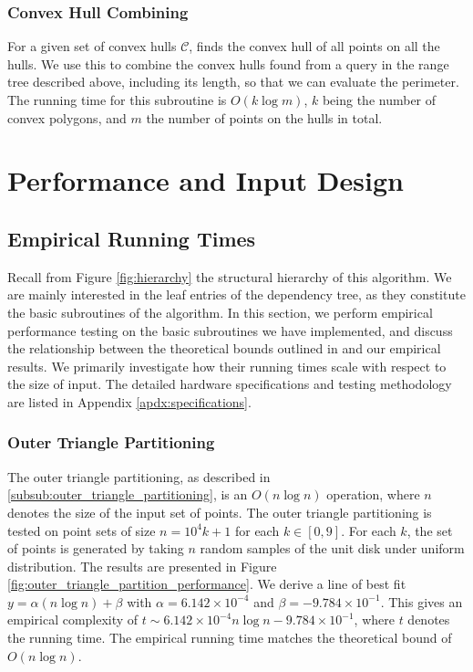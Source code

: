 \documentclass{article}
\newcommand{\figref}[1]{Figure \ref{#1}}
\newcommand{\apdxref}[1]{Appendix \ref{#1}}
\begin{document}
\subsubsection{Convex Hull Combining}
For a given set of convex hulls $\mathcal{C}$, finds the convex hull of all points on all the hulls. We use this to combine the convex hulls found from a query in the range tree described above, including its length, so that we can evaluate the perimeter. The running time for this subroutine is $O(k \log m)$, $k$ being the number of convex polygons, and $m$ the number of points on the hulls in total.

\section{Performance and Input Design}


\subsection{Empirical Running Times}

Recall from \figref{fig:hierarchy} the structural hierarchy of this algorithm. We are mainly interested in the leaf entries of the dependency tree, as they constitute the basic subroutines of the algorithm. In this section, we perform empirical performance testing on the basic subroutines we have implemented, and discuss the relationship between the theoretical bounds outlined in \cite{abb17} and our empirical results. We primarily investigate how their running times scale with respect to the size of input. The detailed hardware specifications and testing methodology are listed in \apdxref{apdx:specifications}.

\subsubsection{Outer Triangle Partitioning}

The outer triangle partitioning, as described in \ref{subsub:outer_triangle_partitioning}, is an $O(n \log n)$ operation, where $n$ denotes the size of the input set of points. The outer triangle partitioning is tested on point sets of size $n = 10^4 k + 1$ for each $k \in [0, 9]$. For each $k$, the set of points is generated by taking $n$ random samples of the unit disk under uniform distribution. The results are presented in \figref{fig:outer_triangle_partition_performance}. We derive a line of best fit $y = \alpha(n \log n) + \beta$ with $\alpha = 6.142 \times 10^{-4}$ and $\beta = -9.784 \times 10^{-1}$. This gives an empirical complexity of $t \sim 6.142 \times 10^{-4} n \log n -9.784 \times 10^{-1}$, where $t$ denotes the running time. The empirical running time matches the theoretical bound of $O(n \log n)$.
\end{document}
